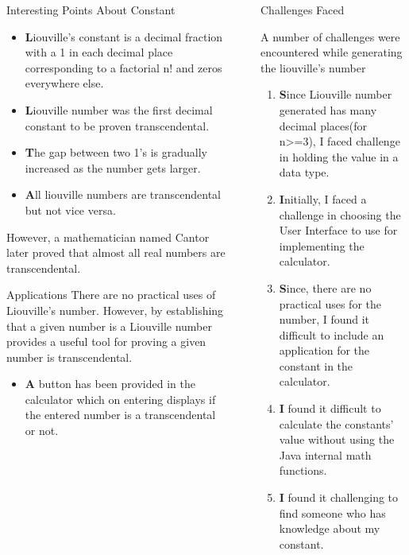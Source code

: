 \documentclass[final]{beamer}
\newlength{\sepwidth}
\newlength{\colwidth}
\newcommand{\separatorcolumn}{\begin{column}{\sepwidth}\end{column}}
\begin{document}
\begin{frame}[t]
\begin{columns}[t]
\begin{column}{\colwidth}
\begin{block}{Interesting Points About Constant}
    \begin{itemize}
      \item \textbf Liouville's constant is a decimal fraction with a 1 in each decimal place corresponding to a factorial n! and zeros everywhere else.
      \item \textbf Liouville number was the first decimal constant to be proven transcendental.
      \item \textbf The gap between two 1's is gradually increased as the number gets larger.
      \item \textbf All liouville numbers are transcendental but not vice versa.
    \end{itemize}

  However, a mathematician named Cantor later proved that almost all real numbers are transcendental.

  \end{block}
  
  \begin{alertblock}{Applications}
    There are no practical uses of Liouville's number.
    However, by establishing that a given number is a Liouville number provides a useful tool for proving a given number is transcendental.

    \begin{itemize}
      \item \textbf A button has been provided in the calculator which on entering displays if the entered number is a transcendental or not. 
    \end{itemize}

  \end{alertblock}

\end{column}

\separatorcolumn

\begin{column}{\colwidth}

  \begin{block}{Challenges Faced}

   A number of challenges were encountered while generating the liouville's number
    \begin{enumerate}
      \item \textbf Since Liouville number generated has many decimal places(for n>=3), I faced challenge in holding the value in a data type. 
      \item \textbf Initially, I faced a challenge in choosing the User Interface to use for implementing the calculator.
      \item \textbf Since, there are no practical uses for the number, I found it difficult to include an application for the constant in the calculator.
      \item \textbf I found it difficult to calculate the constants' value without using the Java internal math functions.
      \item \textbf I found it challenging to find someone who has knowledge about my constant.
    \end{enumerate}


\end{block}
\end{column}
\end{columns}
\end{frame}
\end{document}
